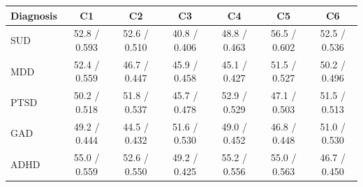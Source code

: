\begin{tabular}{lcccccc}
\hline
Diagnosis & C1 & C2 & C3 & C4 & C5 & C6 \\
\hline
SUD & 52.8 / 0.593 & 52.6 / 0.510 & 40.8 / 0.406 & 48.8 / 0.463 & 56.5 / 0.602 & 52.5 / 0.536 \\
MDD & 52.4 / 0.559 & 46.7 / 0.447 & 45.9 / 0.458 & 45.1 / 0.427 & 51.5 / 0.527 & 50.2 / 0.496 \\
PTSD & 50.2 / 0.518 & 51.8 / 0.537 & 45.7 / 0.478 & 52.9 / 0.529 & 47.1 / 0.503 & 51.5 / 0.513 \\
GAD & 49.2 / 0.444 & 44.5 / 0.432 & 51.6 / 0.530 & 49.0 / 0.452 & 46.8 / 0.448 & 51.0 / 0.530 \\
ADHD & 55.0 / 0.559 & 52.6 / 0.550 & 49.2 / 0.425 & 55.2 / 0.556 & 55.0 / 0.563 & 46.7 / 0.450 \\
\hline
\end{tabular}
